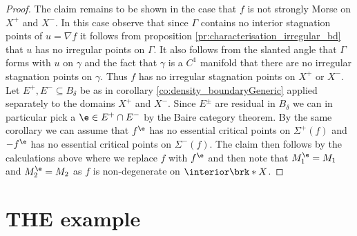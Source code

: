 \begin{proof}
  The claim remains to be shown in the case that $f$ is not strongly Morse on $X^+$ and $X^-$. In this case 
  observe that since $\Gamma$ contains no interior stagnation points of $u=\nabla f$ it follows from proposition \ref{pr:characterisation_irregular_bd}
  that $u$ has no irregular points on $\Gamma$. It also follows from the slanted angle 
  that $\Gamma$ forms with $u$ on
  $\gamma$ and the fact that $\gamma$ is a $C^1$ manifold that there are no irregular stagnation points on $\gamma$.
  Thus $f$ has no irregular stagnation points on $X^+$ or $X^-$.
  Let $E^+,E^-\subseteq B_\delta$ be as in corollary \ref{co:density_boundaryGeneric} applied separately to the domains $X^+$ and $X^-$.
  Since $E^\pm$ are residual in $B_\delta$ we can in particular pick a $\e\in E^+\cap E^-$ by the Baire category theorem.
  By the same corollary we can assume that $f^\e$ has no essential critical points on
  $\Sigma^+(f)$ and $-f^\e$ has no essential critical points on $\Sigma^-(f)$.
  The claim then follows by the calculations above where we replace
  $f$ with $f^\e$ and then note that $M_1^\e=M_1$ and $M_2^\e=M_2$ as $f$ is non-degenerate on $\interior\brk*{X}$.
\end{proof}


\section{THE example}

